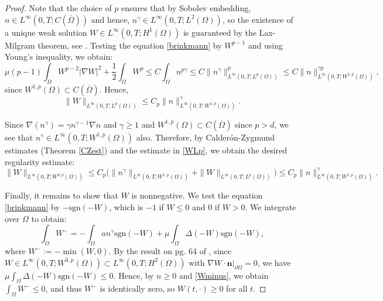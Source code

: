 \documentclass[12pt]{article}
\newcommand{\bd}{\boldsymbol}
\theoremstyle{plain}
\begin{document}
\begin{proof}
Note that the choice of $p$ ensures that by Sobolev embedding, $n \in L^{\infty}(0, T;  C(\overline{\Omega}))$ and hence, $n^{\gamma} \in L^{\infty}(0, T; L^{2}(\Omega))$, so the existence of a unique weak solution $W \in L^{\infty}(0, T; H^{1}(\Omega))$ is guaranteed by the Lax-Milgram theorem, see \cite{EvansPDE}. Testing the equation \eqref{brinkmann} by $W^{p - 1}$ and using Young's inequality, we obtain:
\begin{equation}\label{WH1}
\mu (p - 1)\int_{\Omega} W^{p - 2} |\nabla W|^{2} + \frac{1}{2} \int_{\Omega} W^{p} \le C\int_{\Omega} n^{p\gamma} \le C\|n^{\gamma}\|^{p}_{L^{\infty}(0, T; L^{p}(\Omega))} \le C\|n\|_{L^{\infty}(0, T; W^{1, p}(\Omega))}^{\gamma p},
\end{equation}
since $W^{1, p}(\Omega) \subset C(\overline{\Omega})$. Hence,
\begin{equation}\label{WLp}
\|W\|_{L^{\infty}(0, T; L^{p}(\Omega))} \le C_p\|n\|^{\gamma}_{L^{\infty}(0, T; W^{1, p}(\Omega))}.
\end{equation}

Since $\nabla (n^{\gamma}) = \gamma n^{\gamma - 1} \nabla n$ and $\gamma \ge 1$ and $W^{1, p}(\Omega) \subset C(\overline{\Omega})$ since $p > d$, we see that $n^{\gamma} \in L^{\infty}(0, T; W^{1, p}(\Omega))$ also. Therefore, by Calder\'{o}n-Zygmund estimates (Theorem \ref{CZest}) and the estimate in \eqref{WLp}, we obtain the desired regularity estimate:
\begin{equation*}
\|W\|_{L^{\infty}(0, T; W^{3, p}(\Omega))} \le C_p\Big(\|n^{\gamma}\|_{L^{\infty}(0, T; W^{1, p}(\Omega))} + \|W\|_{L^{\infty}(0, T; L^{p}(\Omega))}\Big) \le C_p\|n\|^{\gamma}_{L^{\infty}(0, T; W^{1, p}(\Omega))}.
\end{equation*}

Finally, it remains to show that $W$ is nonnegative. We test the equation \eqref{brinkmann} by $-\text{sgn}(-W)$, which is $-1$ if $W \le 0$ and $0$ if $W > 0$. We integrate over $\Omega$ to obtain:
\begin{equation}\label{Wminus}
\int_{\Omega} W^{-} = -\int_{\Omega} an^{\gamma} \text{sgn}(-W) + \mu \int_{\Omega} \Delta (-W) \text{sgn}(-W),
\end{equation}
where $W^{-} := -\min(W, 0)$. By the result on pg. 64 of \cite{FeireislNovotny}, since $W \in L^{\infty}(0, T; W^{3, p}(\Omega)) \subset L^{\infty}(0, T; H^{2}(\Omega))$ with $\nabla W \cdot \bd{n}|_{\partial \Omega} = 0$, we have $\displaystyle
\mu \int_{\Omega} \Delta (-W) \text{sgn}(-W) \le 0$. Hence, by $n \ge 0$ and \eqref{Wminus}, we obtain $\displaystyle \int_{\Omega} W^{-} \le 0$, and thus $W^{-}$ is identically zero, so $W(t, \cdot) \ge 0$ for all $t$. 
\end{proof}
\end{document}
